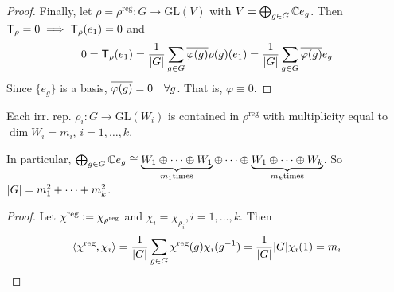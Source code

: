 \begin{theorem}
\begin{proof}
      Finally, let $\rho = \rho^{\text{reg}}: G\to \text{GL}(V)$ with
      $V = \bigoplus_{g\in G} \mathbb{C} e_g$.
      Then ${\sf T}_\rho = 0 \implies {\sf T}_\rho(e_1) = 0$ and
      \[
        0 = {\sf T}_\rho(e_1) = \frac{1}{\lvert G\rvert} \sum_{g\in G}
        \overline{\varphi(g)} \rho(g)(e_1) = \frac{1}{\lvert G\rvert} \sum_{g\in G}
        \overline{\varphi(g)} e_g
      \]
      Since $\{ e_g \}$ is a basis, $\overline{\varphi(g)} = 0 \quad \forall g$.
      That is, $\varphi \equiv 0$. \qedhere
  \end{proof}
\end{theorem}

\begin{prop}
  Each irr. rep. $\rho_i: G\to \text{GL}(W_i)$ is contained in
  $\rho^\text{reg}$ with multiplicity equal to $\dim W_i = m_i$,
  $i = 1,\dots, k$.

  In particular, $\bigoplus_{g\in G} \mathbb{C} e_g \cong
  \underbrace{W_1\oplus\dots\oplus W_1}_{m_1 \text{times}} \oplus \dots \oplus
  \underbrace{W_1\oplus\dots\oplus W_k}_{m_k \text{times}}$.
  So $\lvert G\rvert = m_1^2 + \dots + m_k^2$.

  \begin{proof}
    Let $\chi^\text{reg} \vcentcolon= \chi_{\rho^\text{reg}}$ and
    $\chi_i = \chi_{\rho_i}, i = 1, \dots, k$. Then
    \[
      \langle\chi^\text{reg}, \chi_i\rangle = \frac{1}{\lvert G\rvert} \sum_{g\in G}
      \chi^\text{reg}(g)\chi_i(g^{-1})
      = \frac{1}{\lvert G\rvert} \lvert G\rvert \chi_i(1) = m_i
    \]
  \end{proof}
\end{prop}

